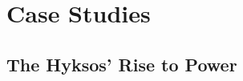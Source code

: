 \documentclass[a4paper, 12pt]{article}
\begin{document}




\section{Case Studies}
\subsection{The Hyksos' Rise to Power}
\end{document}
